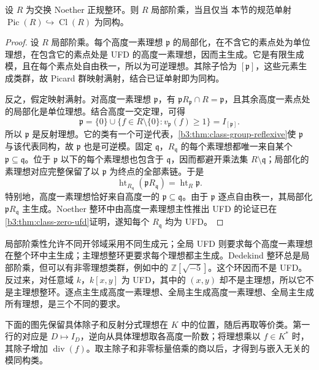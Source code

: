 \begin{proposition}\label{b3:prop:locally-factorial-pic-cl}
	设 \(R\) 为交换 Noether 正规整环。则 \(R\) 局部阶乘，当且仅当 本节的规范单射 \(\operatorname{Pic}(R)\hookrightarrow\operatorname{Cl}(R)\) 为同构。
\end{proposition}
\begin{proof}
	设 \(R\) 局部阶乘。每个高度一素理想 \(\mathfrak p\) 的局部化，在不含它的素点处为单位理想，在包含它的素点处是 UFD 的高度一素理想，因而主生成。它是有限生成模，且在每个素点处自由秩一，所以为可逆理想。其除子恰为 \([\mathfrak p]\)，这些元素生成类群，故 Picard 群映射满射，结合已证单射即为同构。

	反之，假定映射满射。对高度一素理想 \(\mathfrak p\)，有 \(\mathfrak pR_{\mathfrak p}\cap R=\mathfrak p\)，且其余高度一素点处的局部化是单位理想。结合高度一交定理，可得
	\[
		\mathfrak p=\{0\}\cup\{f\in R\setminus\{0\}:v_{\mathfrak p}(f)\ge1\} =I_{[\mathfrak p]}.
	\]
	所以 \(\mathfrak p\) 是反射理想。它的类有一个可逆代表，\cref{b3:thm:class-group-reflexive}使 \(\mathfrak p\) 与该代表同构，故 \(\mathfrak p\) 也是可逆模。固定 \(\mathfrak q\)，\(R_{\mathfrak q}\) 的每个素理想都唯一来自某个 \(\mathfrak p\subseteq\mathfrak q\)。位于 \(\mathfrak p\) 以下的每个素理想也包含于 \(\mathfrak q\)，因而都避开乘法集 \(R\setminus\mathfrak q\)；局部化的素理想对应完整保留了以 \(\mathfrak p\) 为终点的全部素链。于是
	\[
		\operatorname{ht}_{R_{\mathfrak q}}(\mathfrak pR_{\mathfrak q}) =\operatorname{ht}_R\mathfrak p.
	\]
	特别地，高度一素理想恰好来自高度一的 \(\mathfrak p\subseteq\mathfrak q\)。由于 \(\mathfrak p\) 逐点自由秩一，其局部化 \(\mathfrak pR_{\mathfrak q}\) 主生成。Noether 整环中由高度一素理想主性推出 UFD 的论证已在\cref{b3:thm:class-zero-ufd}证明，遂知每个 \(R_{\mathfrak q}\) 均为 UFD。
\end{proof}

局部阶乘性允许不同开邻域采用不同生成元；全局 UFD 则要求每个高度一素理想在整个环中主生成；主理想整环更要求每个理想都主生成。Dedekind 整环总是局部阶乘，但可以有非零理想类群，例如中的 \(\mathbb Z[\sqrt{-5}]\)。这个环因而不是 UFD。反过来，对任意域 \(k\)，\(k[x,y]\) 为 UFD，其中的 \((x,y)\) 却不是主理想，所以它不是主理想整环。逐点主生成高度一素理想、全局主生成高度一素理想、全局主生成所有理想，是三个不同的要求。

\ProseParagraphBreak
下面的图先保留具体除子和反射分式理想在 \(K\) 中的位置，随后再取等价类。第一行的对应是 \(D\mapsto I_D\)，逆向从具体理想取各高度一阶数；将理想乘以 \(f\in K^*\) 时，其除子增加 \(\operatorname{div}(f)\)。取主除子和非零标量倍乘的商以后，才得到与嵌入无关的模同构类。

